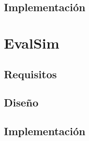 \subsection{Implementación}

\section{EvalSim}

\subsection{Requisitos}

\subsection{Diseño}

\subsection{Implementación}





